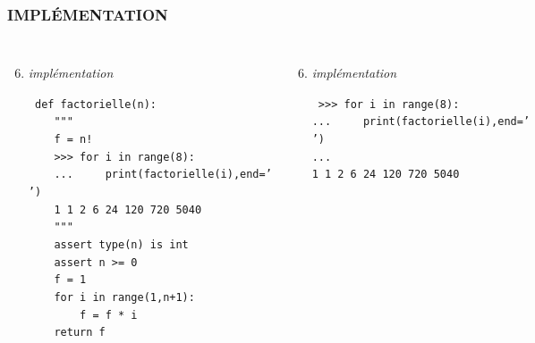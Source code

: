 \begin{frame}
\frametitle{\uppercase{Implémentation}}
\begin{columns}[T]
\column{5.25cm}
\begin{enumerate}\setcounter{enumi}{5}
\item {\em implémentation}
\begin{minipage}[t]{5.5cm}\scriptsize\tt
def factorielle(n):\\
\mbox{}\ \ \ \ {"""}\\
\mbox{}\ \ \ \ {f = n!}\\
\mbox{}\ \ \ \ {{>}{>}> for i in range(8):}\\
\mbox{}\ \ \ \ {...\ \ \ \ \ print(factorielle(i),end=' ')}\\
\mbox{}\ \ \ \ {1 1 2 6 24 120 720 5040}\\
\mbox{}\ \ \ \ {"""}\\
\mbox{}\ \ \ \ assert type(n) is int\\
\mbox{}\ \ \ \ assert n >= 0\\
\mbox{}\ \ \ \ {f = 1}\\
\mbox{}\ \ \ \ \alert{for i in range(1,n+1):} \\
\mbox{}\ \ \ \ \ \ \ \ \alert{f = f * i}\\
\mbox{}\ \ \ \ return f
\end{minipage}
\end{enumerate}

\column{5.25cm}
\begin{enumerate}\setcounter{enumi}{5}
\item {\em implémentation}
\begin{minipage}[t]{5cm}\scriptsize\tt
{>}{>}> for i in range(8):\\
...\ \ \ \ \ print(factorielle(i),end=' ')\\
...\\
1 1 2 6 24 120 720 5040
\end{minipage}
\end{enumerate} 

\end{columns}

\end{frame}
\note{}


